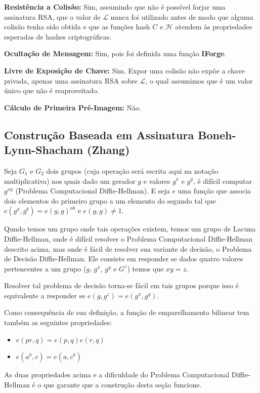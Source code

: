 \documentclass[a4paper]{article}
\begin{document}
\textbf{Resistência a Colisão: }Sim, assumindo que não é possível
forjar uma assinatura RSA, que o valor de $\mathcal{L}$ nunca foi
utilizado antes de modo que alguma colisão tenha sido obtida e que as
funções hash $C$ e $\mathcal{H}$ atendem às propriedades esperadas de
hashes criptográficas.

\textbf{Ocultação de Mensagem: }Sim, pois foi definida uma função
\textbf{IForge}.

\textbf{Livre de Exposição de Chave: } Sim. Expor uma colisão não
expõe a chave privada, apenas uma assinatura RSA sobre $\mathcal{L}$,
o qual assumimos que é um valor único que não é reaproveitado.
  
\textbf{Cálculo de Primeira Pré-Imagem: }Não.

\subsection{Construção Baseada em Assinatura Boneh-Lynn-Shacham (Zhang) \cite{zhang}}

Seja $G_1$ e $G_2$ dois grupos (cuja operação será escrita aqui na
notação multiplicativa) nos quais dado um gerador $g$ e valores $g^x$
e $g^y$, é difícil computar $g^{xy}$ (Problema Computacional
Diffie-Hellman). E seja $e$ uma função que associa dois elementos do
primeiro grupo a um elemento do segundo tal que $e(g^a, g^b) = e(g,
g)^{ab}$ e $e(g, g) \neq 1$.

Qundo temos um grupo onde tais operações existem, temos um grupo de
Lacuna Diffie-Hellman, onde é difícil resolver o Problema
Computacional Diffie-Hellman descrito acima, mas onde é fácil de
resolver sua variante de decisão, o Problema de Decisão
Diffie-Hellman. Ele consiste em responder se dados quatro valores
pertencentes a um grupo ($g$, $g^x$, $g^y$ e $G^z$) temos que $xy=z$.

Resolver tal problema de decisão torna-se fácil em tais grupos porque
isso é equivalente a responder se $e(g, g^z) = e(g^x, g^y)$.

Como consequência de sua definição, a função de emparelhamento
bilinear tem também as seguintes propriedades:

\begin{itemize}
\item$e(pr, q) = e(p, q)e(r, q)$
\item$e(a^b, c) = e(a, c^b)$
\end{itemize}

As duas propriedades acima e a dificuldade do Problema Computacional
Diffie-Hellman é o que garante que a construção desta seção funcione.
\end{document}
